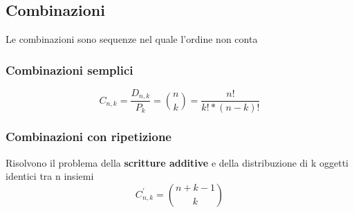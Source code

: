 \documentclass{report}
\begin{document}
    \subsection{Combinazioni}
    Le combinazioni sono sequenze nel quale l'ordine non conta
        \subsubsection{Combinazioni semplici}
            $$C_{n,k} = \frac{D_{n,k}}{P_k} = \binom{n}{k} = \frac{n!}{k! * (n-k)!}$$
        \subsubsection{Combinazioni con ripetizione}
            Risolvono il problema della \textbf{scritture additive} e della distribuzione
            di k oggetti identici tra n insiemi
            $$C_{n,k}^{'} = \binom{n + k - 1}{k}$$
\end{document}
